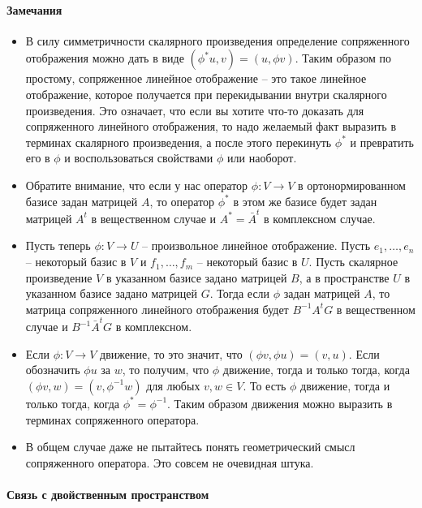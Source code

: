 \paragraph{Замечания}
\begin{itemize}
\item В силу симметричности скалярного произведения определение сопряженного отображения можно дать в виде $(\phi^* u, v) = (u, \phi v)$. Таким образом по простому, сопряженное линейное отображение  -- это такое линейное отображение, которое получается при перекидывании внутри скалярного произведения. Это означает, что если вы хотите что-то доказать для сопряженного линейного отображения, то надо желаемый факт выразить в терминах скалярного произведения, а после этого перекинуть $\phi^*$ и превратить его в $\phi$ и воспользоваться свойствами $\phi$ или наоборот.

\item Обратите внимание, что если у нас оператор $\phi\colon V\to V$ в ортонормированном базисе задан матрицей $A$, то оператор $\phi^*$ в этом же базисе будет задан матрицей $A^t$ в вещественном случае и $A^* = \bar A^t$ в комплексном случае. 

\item Пусть теперь $\phi\colon V\to U$ -- произвольное линейное отображение. Пусть $e_1,\ldots,e_n$ -- некоторый базис в $V$ и $f_1,\ldots, f_m$ -- некоторый базис в $U$. Пусть скалярное произведение $V$ в указанном базисе задано матрицей $B$, а в пространстве $U$ в указанном базисе задано матрицей $G$. Тогда если $\phi$ задан матрицей $A$, то матрица сопряженного линейного отображения будет $B^{-1} A^t G$ в вещественном случае и $B^{-1}\bar A^t G$ в комплексном.

\item Если $\phi\colon V\to V$ движение, то это значит, что $(\phi v, \phi u) = (v, u)$. Если обозначить $\phi u $ за $w$, то получим, что $\phi$ движение, тогда и только тогда, когда $(\phi v, w) = (v, \phi^{-1}w)$ для любых $v,w\in V$. То есть $\phi$ движение, тогда и только тогда, когда $\phi^* = \phi^{-1}$. Таким образом движения можно выразить в терминах сопряженного оператора.

\item В общем случае даже не пытайтесь понять геометрический смысл сопряженного оператора. Это совсем не очевидная штука.
\end{itemize}

\paragraph{Связь с двойственным пространством}

